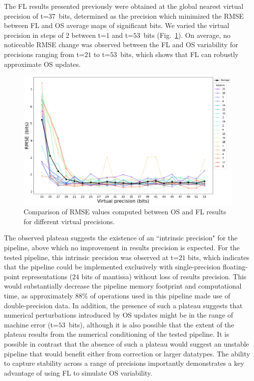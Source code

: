 The FL results presented previously were obtained at the global nearest virtual precision
of t=$37$~bits, determined as the precision which minimized the RMSE
between FL and OS average maps of significant bits. We varied the
virtual precision in steps of $2$ between t=$1$ and t=$53$~bits
(Fig.~\ref{fig:vprecision}). On average, no noticeable RMSE change was
observed between the FL and OS variability for precisions ranging from
t=$21$ to t=$53$~bits, which shows that FL can robustly approximate OS updates.
\begin{figure}[t]
  \centering
  \includegraphics[width=.7\columnwidth]{chapters/chapter2/figures/rmse-precisions.png}
  \caption{Comparison of RMSE values computed between OS and FL results for different virtual precisions.}  \label{fig:vprecision}
\end{figure}

The observed plateau suggests the existence of an ``intrinsic precision" for the pipeline, above
which no improvement in results precision is expected. For the tested pipeline,
this intrinsic precision was observed at t=$21$ bits, which indicates that
the pipeline could be implemented exclusively with single-precision
floating-point representations ($24$ bits of mantissa) without loss of
results precision. This would substantially decrease the pipeline memory
footprint and computational time, as approximately $88\%$ of operations used in this pipeline
made use of double-precision data.
In addition, the presence of such a
plateau suggests that numerical perturbations introduced by OS updates
might be in the range of machine error (t=$53$~bits), although it is also
possible that the extent of the plateau results from the numerical conditioning of the
tested pipeline. It is possible in contrast that the absence of such a plateau
would suggest an unstable pipeline that would benefit either from correction or larger datatypes.
The ability to capture stability across a range of precisions importantly
demonstrates a key advantage of using FL to simulate OS variability. 


